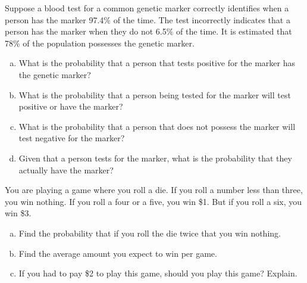 \documentclass[11pt,letterpaper]{article}
\begin{document}
\newpage



 Suppose a blood test for a common genetic marker correctly identifies when a person has the marker 97.4\% of the time. The test incorrectly indicates that a person has the marker when they do not 6.5\% of the time. It is estimated that 78\% of the population possesses the genetic marker. 
	\begin{enumerate}[(a)]
	\item What is the probability that a person that tests positive for the marker has the genetic marker?
	\item What is the probability that a person being tested for the marker will test positive or have the marker? 
	\item What is the probability that a person that does not possess the marker will test negative for the marker?
	\item Given that a person tests for the marker, what is the probability that they actually have the marker? 
	\end{enumerate}



\newpage



 You are playing a game where you roll a die. If you roll a number less than three, you win nothing. If you roll a four or a five, you win \$1. But if you roll a six, you win \$3. 
	\begin{enumerate}[(a)]
	\item Find the probability that if you roll the die twice that you win nothing.
	\item Find the average amount you expect to win per game.
	\item If you had to pay \$2 to play this game, should you play this game? Explain. 
	\end{enumerate}
\end{document}
